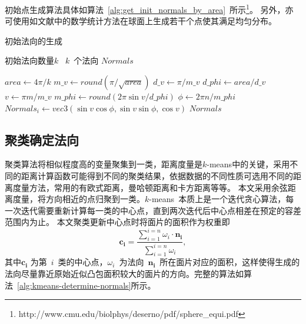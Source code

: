 初始点生成算法具体如算法~\ref{alg:get_init_normals_by_area}~所示\footnote{http://www.cmu.edu/biolphys/deserno/pdf/sphere\_equi.pdf}。
另外，亦可使用如文献中的数学统计方法在球面上生成若干个点使其满足均匀分布。

\begin{algorithm}[htbp]
\small
\caption{初始法向的生成}
\label{alg:get_init_normals_by_area}
\begin{algorithmic}[1]
\Require
初始法向数量$k$
\Ensure
~$k$~个法向 $Normals$

  \State $area \leftarrow 4\pi / k$
  \State $m\_v \gets round(\pi/\sqrt{area})$
  \State $d\_v \gets \pi/m\_v$
  \State $d\_phi \gets area/d\_v$
      \State $v \gets \pi m/m\_v$
      \State $m\_phi \gets round(2\pi\sin{v}/d\_phi)$
          \State $\phi \gets 2\pi n/m\_phi$
          \State $Normals_i \gets vec3(\sin{v}\cos{\phi},\sin{v}\sin{\phi},\cos{v})$
      \EndFor
  \EndFor
  \State \Return $Normals$
  \EndFunction
\end{algorithmic}
\end{algorithm}

 
\subsection{聚类确定法向}
\label{subsec:determ-normals}

聚类算法将相似程度高的变量聚集到一类，距离度量是$k$-means中的关键，采用不同的距离计算函数可能得到不同的聚类结果，依据数据的不同性质可选用不同的距离度量方法，常用的有欧式距离，曼哈顿距离和卡方距离等等。
本文采用余弦距离度量，将方向相近的点归聚到一类。$k$-means~本质上是一个迭代贪心算法，每一次迭代需要重新计算每一类的中心点，直到两次迭代后中心点相差在预定的容差范围内为止。
本文聚类更新中心点时将面片的面积作为权重即
\begin{equation}
\label{equ:kmeans-update-center}
\bm{c_i}=\frac{\sum_{i=1}^{i=n} \omega_i \cdot \bm{n_i} } {\sum_{i=1}^{i=n} \omega_i}
,
\end{equation}
其中$\bm{c_i}$
为第~$i$~类的中心点，$\omega_i$~为法向~$\bm{n_i}$~所在面片对应的面积，这样使得生成的法向尽量靠近原始近似凸包面积较大的面片的方向。完整的算法如算法~\ref{alg:kmeans-determine-normals}所示。

